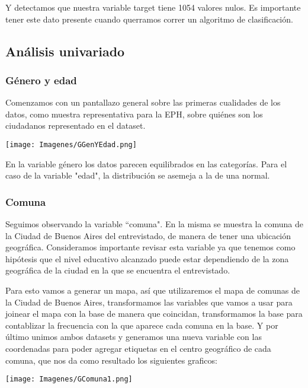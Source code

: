 \documentclass[a4paper]{article}
\begin{document}
    Y detectamos que nuestra variable target tiene 1054 valores nulos. Es importante tener este dato presente cuando querramos correr un algoritmo de clasificación.
    
    \subsection{Análisis univariado}
    
        \subsubsection{Género y edad}
        
            Comenzamos con un pantallazo general sobre las primeras cualidades de los datos, como muestra representativa para la EPH, sobre quiénes son los ciudadanos representado en el dataset.
        
            \texttt{[image: Imagenes/GGenYEdad.png]}

            En la variable género los datos parecen equilibrados en las categorías. Para el caso de la variable "edad", la distribución se asemeja a la de una normal.
        
        \subsubsection{Comuna}
        
            Seguimos observando la variable ``comuna". En la misma se muestra la comuna de la Ciudad de Buenos Aires del entrevistado, de manera de tener una ubicación geográfica. Consideramos importante revisar esta variable ya que tenemos como hipótesis que el nivel educativo alcanzado puede estar dependiendo de la zona geográfica de la ciudad en la que se encuentra el entrevistado.
        
            Para esto vamos a generar un mapa, así que utilizaremos el mapa de comunas de la Ciudad de Buenos Aires, transformamos las variables que vamos a usar para joinear el mapa con la base de manera que coincidan, transformamos la base para contablizar la frecuencia con la que aparece cada comuna en la base. Y por último unimos ambos datasets y generamos una nueva variable con las coordenadas para poder agregar etiquetas en el centro geográfico de cada comuna, que nos da como resultado los siguientes graficos:
        
            \texttt{[image: Imagenes/GComuna1.png]}
\end{document}
